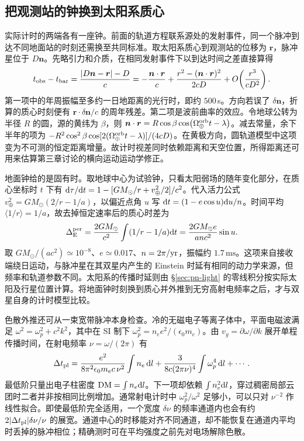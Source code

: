\subsection{把观测站的钟换到太阳系质心}
实际计时的两端各有一座钟。前面的轨道方程联系源处的发射事件，同一个脉冲到达不同地面站的时刻还需换至共同标准。取太阳系质心到观测站的位移为 $\bm r$，脉冲星位于 $D\bm n$。先略引力和介质，在相同发射事件下以到达时间之差直接算得
\[
 t_{\rm obs}-t_{\rm bar}
 =\frac{|D\bm n-\bm r|-D}{c}
 =-\frac{\bm n\cdot\bm r}{c}
   +\frac{r^2-(\bm n\cdot\bm r)^2}{2cD}
   +O\!\left(\frac{r^3}{cD^2}\right).
\]
第一项中的年周振幅至多约一日地距离的光行时，即约 $500\,$s。方向若误了 $\delta\bm n$，折算的质心时刻便有 $\bm r\cdot\delta\bm n/c$ 的周年残差。第二项是波前曲率的效应。令地球公转为半径 $R$ 的圆，源的黄纬为 $\beta$，则 $\bm n\cdot\bm r=R\cos\beta\cos(\Omega_\oplus^{\rm orb}t-\lambda)$。减去常量，余下半年的项为 $-R^2\cos^2\beta\cos[2(\Omega_\oplus^{\rm orb}t-\lambda)]/(4cD)$。在黄极方向，圆轨道模型中这项变为不可测的恒定距离增量。故计时视差同时依赖距离和天空位置，所得距离还可用来估算第三章讨论的横向运动运动学修正。

地面钟给的是固有时。取地球中心为试验钟，只看太阳弱场的随年变化部分，在质心坐标时 $t$ 下有 $\dd\tau/\dd t=1-[GM_\odot/r+v_\oplus^2/2]/c^2$。代入活力公式 $v_\oplus^2=GM_\odot(2/r-1/a)$，以偏近点角 $u$ 写 $\dd t=(1-e\cos u)\dd u/n$。时间平均 $\langle1/r\rangle=1/a$，故去掉恒定速率后的质心时差为
\[
 \Delta_{\rm E}^{\rm per}
 =\frac{2GM_\odot}{c^2}\int(1/r-1/a)\dd t
 =\frac{2GM_\odot e}{a n c^2}\sin u .
\]
取 $GM_\odot/(ac^2)\simeq10^{-8}$、$e\simeq0.017$、$n=2\pi/{\rm yr}$，振幅约 $1.7\,\mathrm{ms}$。这项来自接收端绕日运动，与脉冲星在其双星内产生的 Einstein 时延有相同的动力学来源，但频率和轨道参数不同。太阳系的传播时延则由 \S\ref{sec:pn-light} 的零线积分按实际太阳及行星位置计算。将地面钟时刻换到质心并外推到无穷高射电频率之后，才与双星自身的计时模型比较。

色散外推还可从一束宽带脉冲本身检查。冷的无磁电子等离子体中，平面电磁波满足 $\omega^2=\omega_p^2+c^2k^2$，其中在 SI 制下 $\omega_p^2=n_e e^2/(\epsilon_0m_e)$。由 $v_g=\partial\omega/\partial k$ 展开单程传播时间，在射电频率 $\nu=\omega/(2\pi)$ 有
\[
 \Delta t_{\rm pl}=\frac{e^2}{8\pi^2\epsilon_0m_e c\,\nu^2}
       \int n_e\,\dd l+
       \frac{3}{8c(2\pi\nu)^4}\int\omega_p^4\,\dd l+\cdots .
\]
最低阶只量出电子柱密度 $\mathrm{DM}=\int n_e\dd l$。下一项却依赖 $\int n_e^2\dd l$，穿过稠密局部云团时二者并非按相同比例增加。通常射电计时中 $\omega_p^2/\omega^2$ 足够小，可以只对 $\nu^{-2}$ 作线性拟合。即使最低阶完全适用，一个宽度 $\delta\nu$ 的频率通道内也会有约 $2|\Delta t_{\rm pl}|\delta\nu/\nu$ 的展宽。通道中心的时移能对齐不同通道，却不能恢复在通道内平均时丢掉的脉冲相位；精确测时可在平均强度之前先对电场解除色散。

